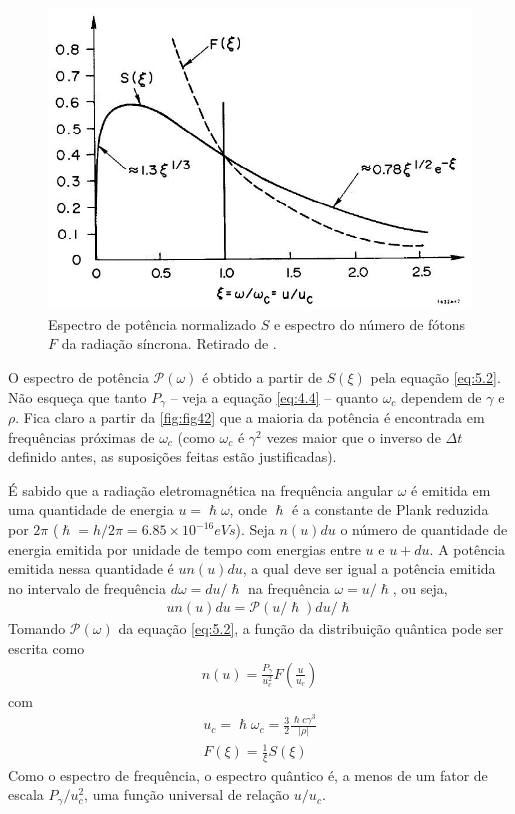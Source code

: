 \begin{figure}[!htb]
	\centering
	\includegraphics[width=0.7\linewidth]{./Figuras/fig42.jpeg}
	\caption{Espectro de potência normalizado $S$ e espectro do número de fótons $F$ da radiação síncrona. Retirado de \cite{sands1970physics}.}
	\label{fig:fig42}
\end{figure}

O espectro de potência $\mathscr{P}(\omega)$ é obtido a partir de $S(\xi)$ pela equação \eqref{eq:5.2}. Não esqueça que tanto $P_\gamma$ -- veja a equação \eqref{eq:4.4} -- quanto $\omega_c$ dependem de $\gamma$ e $\rho$. Fica claro a partir da \autoref{fig:fig42} que a maioria da potência é encontrada em frequências próximas de $\omega_c$ (como $\omega_c$ é $\gamma^2$ vezes maior que o inverso de $\Delta t$ definido antes, as suposições feitas estão justificadas).

É sabido que a radiação eletromagnética na frequência angular $\omega$ é emitida em uma quantidade de energia $u=\hslash \omega$, onde $\hslash$ é a constante de Plank reduzida por $2\pi$ ($\hslash = h/2\pi = 6.85 \times 10^{-16} eVs$). Seja $n(u)du$ o número de quantidade de energia emitida por unidade de tempo com energias entre $u$ e $u+du$. A potência emitida nessa quantidade é $u n(u)du$, a qual deve ser igual a potência emitida no intervalo de frequência $d\omega = du/\hslash$ na frequência $\omega = u/\hslash$, ou seja,
\begin{align}
	un(u)du = \mathscr{P}(u/\hslash)du/\hslash
\end{align}
Tomando $\mathscr{P}(\omega)$ da equação \eqref{eq:5.2}, a função da distribuição quântica pode ser escrita como
\begin{align}
	n(u) = \frac{P_\gamma}{u_c^2}F\left(\frac{u}{u_c}\right)
\end{align}
com
\begin{align}
	u_c = \hslash \omega_c = \frac{3}{2}\frac{\hslash c \gamma^3}{|\rho|}\label{eq:5.9}\\
	F(\xi) = \frac{1}{\xi}S(\xi)
\end{align}
Como o espectro de frequência, o espectro quântico é, a menos de um fator de escala $P_\gamma/u_c^2$, uma função universal de relação $u/u_c$.

